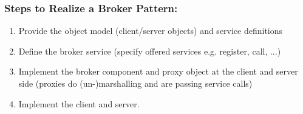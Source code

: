 \subsubsection*{Steps to Realize a Broker Pattern:}
\begin{enumerate}
  \item Provide the object model (client/server objects) and service definitions
  \item Define the broker service (specify offered services e.g. register, call, ...)
  \item Implement the broker component and proxy object at the client and server side (proxies do \hbox{(un-)marshalling} and are passing service calls)
  \item Implement the client and server.
\end{enumerate}
\newpage